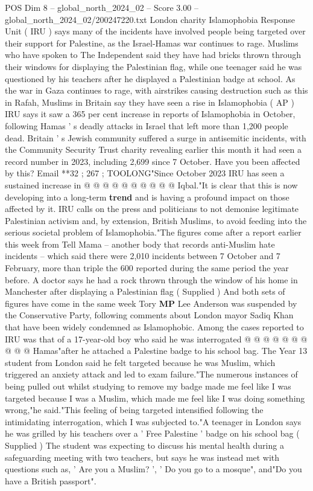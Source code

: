 \begin{textsample}{POS Dim 8 – global\_north\_2024\_02 – Score 3.00 – global\_north\_2024\_02/200247220.txt}  \label{ex:f8_pos_218}
London charity Islamophobia Response Unit ( IRU ) says many of the incidents have involved people being targeted over their support for Palestine, as the Israel-Hamas war continues to rage.
Muslims who have spoken to The Independent said they have had bricks thrown through their windows for displaying the Palestinian flag, while one teenager said he was questioned by his teachers after he displayed a Palestinian badge at school.
As the war in Gaza continues to rage, with airstrikes causing destruction such as this in Rafah, Muslims in Britain say they have seen a rise in Islamophobia ( AP ) IRU says it saw a 365 per cent increase in reports of Islamophobia in October, following Hamas ' s deadly attacks in Israel that left more than 1,200 people dead.
Britain ' s Jewish community suffered a surge in antisemitic incidents, with the Community Security Trust charity revealing earlier this month it had seen a record number in 2023, including 2,699 since 7 October.
Have you been affected by this?
Email **32 ; 267 ; TOOLONG"Since October 2023 IRU has seen a sustained increase in @ @ @ @ @ @ @ @ @ @ Iqbal."It is clear that this is now developing into a long-term \textbf{trend} and is having a profound impact on those affected by it.
IRU calls on the press and politicians to not demonise legitimate Palestinian activism and, by extension, British Muslims, to avoid feeding into the serious societal problem of Islamophobia."The figures come after a report earlier this week from Tell Mama -- another body that records anti-Muslim hate incidents -- which said there were 2,010 incidents between 7 October and 7 February, more than triple the 600 reported during the same period the year before.
A doctor says he had a rock thrown through the window of his home in Manchester after displaying a Palestinian flag ( Supplied ) And both sets of figures have come in the same week Tory \textbf{MP} Lee Anderson was suspended by the Conservative Party, following comments about London mayor Sadiq Khan that have been widely condemned as Islamophobic.
Among the cases reported to IRU was that of a 17-year-old boy who said he was interrogated @ @ @ @ @ @ @ @ @ @ Hamas"after he attached a Palestine badge to his school bag.
The Year 13 student from London said he felt targeted because he was Muslim, which triggered an anxiety attack and led to exam failure."The numerous instances of being pulled out whilst studying to remove my badge made me feel like I was targeted because I was a Muslim, which made me feel like I was doing something wrong,"he said."This feeling of being targeted intensified following the intimidating interrogation, which I was subjected to."A teenager in London says he was grilled by his teachers over a ' Free Palestine ' badge on his school bag ( Supplied ) The student was expecting to discuss his mental health during a safeguarding meeting with two teachers, but says he was instead met with questions such as, ' Are you a Muslim? ', ' Do you go to a mosque", and"Do you have a British passport".

\end{textsample}
